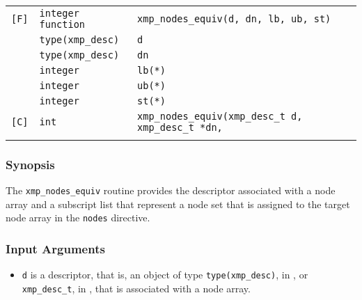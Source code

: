 \begin{tabular}{lll}

\verb![F]!& {\tt integer function}& {\tt xmp\_nodes\_equiv(d, dn, lb,  ub, st)}\\
          & {\tt type(xmp\_desc)} & {\tt d}\\
          & {\tt type(xmp\_desc)} & {\tt dn}\\
          & {\tt integer}         & {\tt lb(*)}\\
          & {\tt integer}         & {\tt ub(*)}\\
          & {\tt integer}         & {\tt st(*)}\\

\verb![C]!&  {\tt int}& {\tt xmp\_nodes\_equiv(xmp\_desc\_t d, xmp\_desc\_t *dn,}\\
          &           & \hspace{3.1cm}{\tt int lb[], int ub[], int st[])}\\

\end{tabular}

\subsubsection*{Synopsis}

The {\tt xmp\_nodes\_equiv} routine provides the descriptor associated
with a node array and a subscript list that represent a node set that is
assigned to the target node array in the {\tt nodes} directive.

\subsubsection*{Input Arguments}
\begin{itemize}
 \item {\tt d} is a descriptor, that is, an object of type 
       {\tt type(xmp\_desc)}, in {\XMPF}, or {\tt xmp\_desc\_t},
       in {\XMPC}, that is associated with a node array.
\end{itemize}

